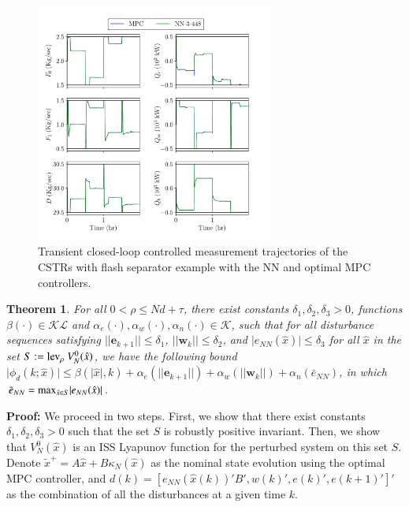 \documentclass[preprint,5p, twocolumn, authoryear]{elsarticle}
\newtheorem{thm}{Theorem}
\begin{document}
\begin{figure}[!h]
    \centering
	\includegraphics[page=2, 
		width=0.7\textwidth, 
		height=0.5\textheight]{cstrs_comparision_plots.pdf}
        \caption{Transient closed-loop controlled measurement 
        trajectories of the CSTRs with 
        flash separator example with the NN and optimal MPC controllers.}  
    \label{fig:cl_cstrs_outputs}
\end{figure}

\begin{thm} \label{thm:nnrobustness}
For all $ 0 < \rho \leq Nd + \tau$, 
there exist constants $\delta_1, \delta_2, \delta_3 > 0$, 
functions $\beta(\cdot) \in \mathcal{K} \mathcal{L}$
and $\alpha_e(\cdot) , \alpha_w(\cdot), \alpha_{n}(\cdot) \in \mathcal{K}$,
such that for all disturbance sequences
satisfying $\vert\vert \mathbf{e}_{k+1} \vert\vert \leq \delta_1$,
$\vert\vert \mathbf{w}_k \vert\vert \leq \delta_2$,
and $\vert e_{NN}(\hat{x}) \vert \leq \delta_3$
for all $\hat{x}$ in the set $S := \textnormal{lev}_{\rho} \ V_N^0(\hat{x})$,
we have the following bound 
$\vert \phi_d(k; \hat{x}) \vert \leq \beta(\vert \hat{x} \vert, k) 
+ \alpha_e(\vert \vert\mathbf{e}_{k+1} \vert \vert) + 
\alpha_w(\vert \vert \mathbf{w}_k \vert \vert) + 
\alpha_n(\bar{e}_{NN})$, 
in which 
$\bar{e}_{NN} = \textnormal{max}_{\hat{x} \in S} \vert e_{NN}(\hat{x}) \vert$.
\end{thm}

\textbf{Proof:}
We proceed in two steps. First, 
we show that there exist constants $\delta_1, \delta_2, \delta_3 > 0$
such that the set $S$ is robustly positive invariant. Then, we 
show that $V_N^0(\hat{x})$ is an ISS Lyapunov function for 
the perturbed system on this set $S$. Denote 
$\tilde{x}^+ = A\hat{x} + B\kappa_N(\hat{x})$ as the nominal 
state evolution using the optimal MPC controller, 
and $d(k) = [ e_{NN}(\hat{x}(k))'B', w(k)', e(k)', e(k+1)']'$
as the combination of all the disturbances at a given time $k$. 
\end{document}
